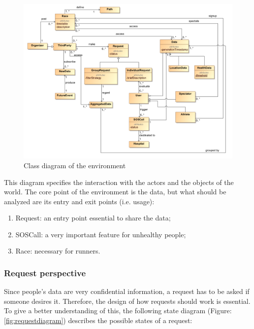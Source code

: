 \begin{figure}[H]
\includegraphics[width=\linewidth]{Images/classdiagram}
\caption{Class diagram of the environment}
\label{fig:classdiagram}
\end{figure}

This diagram specifies the interaction with the actors and the objects of the world. The core point of 
the environment is the data, but what should be analyzed are its entry and exit points (i.e. usage):

\begin{enumerate}
\item Request: an entry point essential to share the data;
\item SOSCall: a very important feature for unhealthy people;
\item Race: necessary for runners.
\end{enumerate}

\subsubsection{Request perspective}
Since people's data are very confidential information, a request has to be asked if someone desires it. 
Therefore, the design of how requests should work is essential. To give a better understanding of this, 
the following state diagram (Figure: \ref{fig:requestdiagram})  describes the possible states of a request:

